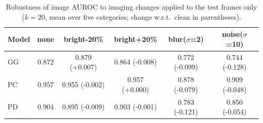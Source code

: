 \begin{table}[t]
\centering
\caption{Robustness of image AUROC to imaging changes applied to the test frames only ($k=20$, mean over five categories; change w.r.t.\ clean in parentheses).}
\label{tab:robust}
\footnotesize
\begin{tabular}{@{}lccccc@{}}
\toprule
Model & none & bright-20\% & bright+20\% & blur($\sigma$=2) & noise($\sigma$=10) \\
\midrule
GG & 0.872 & 0.879 (+0.007) & 0.864 (-0.008) & 0.772 (-0.099) & 0.744 (-0.128) \\
PC & 0.957 & 0.955 (-0.002) & 0.957 (+0.000) & 0.878 (-0.079) & 0.909 (-0.048) \\
PD & 0.904 & 0.895 (-0.009) & 0.903 (-0.001) & 0.783 (-0.121) & 0.850 (-0.054) \\
\bottomrule
\end{tabular}
\end{table}
